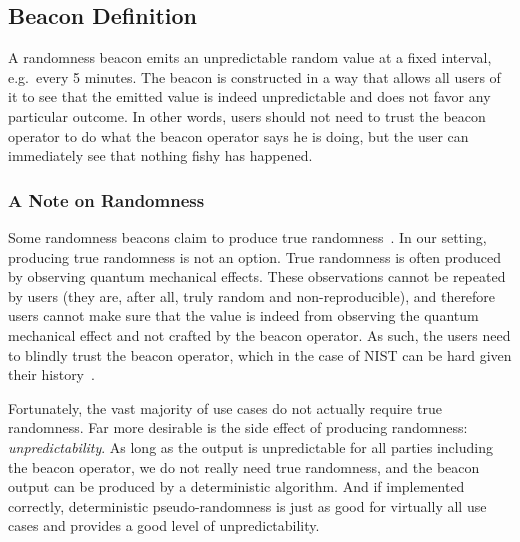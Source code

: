 


\subsection{Beacon Definition}

A randomness beacon emits an unpredictable random value at a fixed interval, e.g.\ every 5 minutes.
The beacon is constructed in a way that allows all users of it to see that the emitted value is indeed unpredictable and does not favor any particular outcome.
In other words, users should not need to trust the beacon operator to do what the beacon operator says he is doing, but the user can immediately see that nothing fishy has happened.

\subsubsection{A Note on Randomness}
Some randomness beacons claim to produce true randomness~\cite{nistbeacon}.
In our setting, producing true randomness is not an option.
True randomness is often produced by observing quantum mechanical effects.
These observations cannot be repeated by users (they are, after all, truly random and non-reproducible), and therefore users cannot make sure that the value is indeed from observing the quantum mechanical effect and not crafted by the beacon operator.
As such, the users need to blindly trust the beacon operator, which in the case of NIST can be hard given their history~\cite{nytimes-nsabackdoors, nytimes-nsaconstants, nist2014backdoor}.

Fortunately, the vast majority of use cases do not actually require true randomness.
Far more desirable is the side effect of producing randomness: \emph{unpredictability}.
As long as the output is unpredictable for all parties including the beacon operator, we do not really need true randomness, and the beacon output can be produced by a deterministic algorithm.
And if implemented correctly, deterministic pseudo-randomness is just as good for virtually all use cases and provides a good level of unpredictability.

